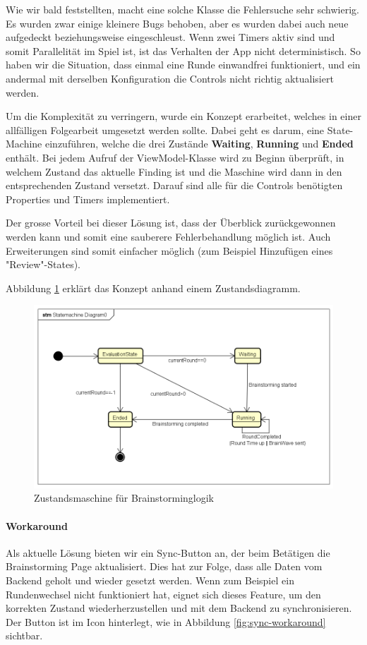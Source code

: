 Wie wir bald feststellten, macht eine solche Klasse die Fehlersuche sehr schwierig. Es wurden zwar einige kleinere Bugs behoben, aber es wurden dabei auch neue aufgedeckt beziehungsweise eingeschleust. Wenn zwei Timers aktiv sind und somit Parallelität im Spiel ist, ist das Verhalten der App nicht deterministisch. So haben wir die Situation, dass einmal eine Runde einwandfrei funktioniert, und ein andermal mit derselben Konfiguration die Controls nicht richtig aktualisiert werden. 

Um die Komplexität zu verringern, wurde ein Konzept erarbeitet, welches in einer allfälligen Folgearbeit umgesetzt werden sollte. Dabei geht es darum, eine State-Machine einzuführen, welche die drei Zustände \textbf{Waiting}, \textbf{Running} und \textbf{Ended} enthält. Bei jedem Aufruf der ViewModel-Klasse wird zu Beginn überprüft, in welchem Zustand das aktuelle Finding ist und die Maschine wird dann in den entsprechenden Zustand versetzt. Darauf sind alle für die Controls benötigten Properties und Timers implementiert. 

Der grosse Vorteil bei dieser Lösung ist, dass der Überblick zurückgewonnen werden kann und somit eine sauberere Fehlerbehandlung möglich ist. Auch Erweiterungen sind somit einfacher möglich (zum Beispiel Hinzufügen eines "Review"-States). 

Abbildung \ref{fig:statemachine-brainstorming} erklärt das Konzept anhand einem Zustandsdiagramm.
\begin{figure}
	\centering
	\includegraphics[width=0.7\linewidth]{img/techn-bericht/statemachine-brainstorming}
	\caption{Zustandsmaschine für Brainstorminglogik}
	\label{fig:statemachine-brainstorming}
\end{figure}

\paragraph*{Workaround}
Als aktuelle Lösung bieten wir ein Sync-Button an, der beim Betätigen die Brainstorming Page aktualisiert. Dies hat zur Folge, dass alle Daten vom Backend geholt und wieder gesetzt werden. Wenn zum Beispiel ein Rundenwechsel nicht funktioniert hat, eignet sich dieses Feature, um den korrekten Zustand wiederherzustellen und mit dem Backend zu synchronisieren. Der Button ist im Icon hinterlegt, wie in Abbildung \ref{fig:sync-workaround} sichtbar.

